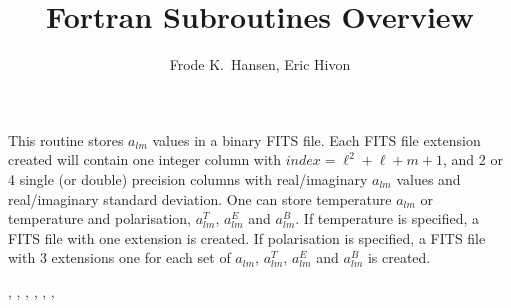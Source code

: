 
\sloppy


\title{\healpix Fortran Subroutines Overview}
 \section[alms2fits*]{ }
\label{sub:alms2fits}
\author{Frode K.~Hansen, Eric Hivon}

\begin{facility}
{This routine stores  $a_{lm}$  values in a binary FITS file. Each FITS file
  extension created will contain one integer column with
  $index=\ell^2+\ell+m+1$, and 2 or 4 single (or double) precision columns with real/imaginary  $a_{lm}$  values and real/imaginary   standard deviation. One can store temperature $a_{lm}$ or temperature and polarisation, $a^T_{lm}$, $a^E_{lm}$ and $a^B_{lm}$. If temperature is specified, a FITS file with one extension is created. If polarisation is specified, a FITS file with 3 extensions one for each set of $a_{lm}$, $a_{lm}^T$, $a_{lm}^E$ and $a_{lm}^B$ is created.}
{\modFitstools}
\end{facility}

\begin{f90format}
{%
, %
, %
, %
, %
, %
, %
}
\end{f90format}

